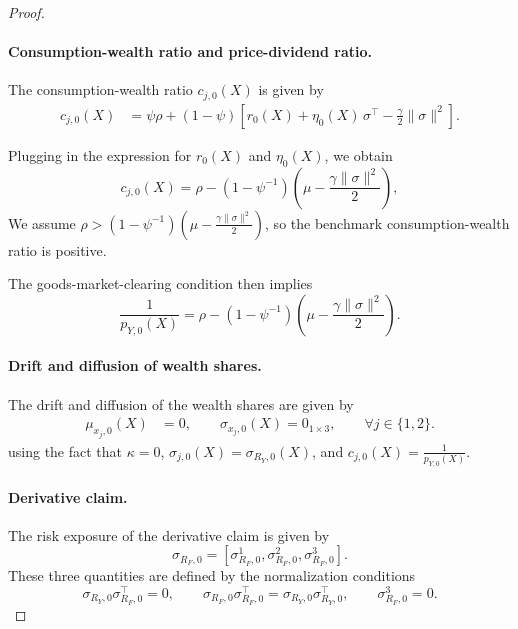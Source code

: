 \begin{proof}
\paragraph{Consumption-wealth ratio and price-dividend ratio.}
The consumption-wealth ratio $c_{j,0}(X)$ is given by
\begin{align}
    c_{j,0}(X) &= \psi \rho 
    + (1-\psi) \left[ r_0(X) + \eta_0(X)\,\sigma^\top - \frac{\gamma}{2} \|\sigma\|^2 \right].
\end{align}

Plugging in the expression for $r_0(X)$ and $\eta_0(X)$, we obtain
\begin{equation}
    c_{j,0}(X) = \rho  - \left(1-\psi^{-1}\right)  \left( \mu - \frac{\gamma\|\sigma\|^2}{2} \right),
\end{equation}
We assume $\rho  > \left(1-\psi^{-1}\right)  \left( \mu - \frac{\gamma\|\sigma\|^2}{2} \right)$, so the benchmark consumption-wealth ratio is positive.

The goods-market-clearing condition then implies
\begin{equation}
    \frac{1}{p_{Y,0}(X)} = \rho  - \left(1-\psi^{-1}\right)  \left( \mu - \frac{\gamma\|\sigma\|^2}{2} \right).
\end{equation}

\paragraph{Drift and diffusion of wealth shares.}
The drift and diffusion of the wealth shares are given by
\begin{align}
    \mu_{x_j,0}(X) &= 0, \qquad
    \sigma_{x_j,0}(X) = 0_{1\times 3}, \qquad
    \forall j \in \{1,2\}.
\end{align}
using the fact that $\kappa = 0$, $\sigma_{j,0}(X) = \sigma_{R_Y,0}(X)$, and $c_{j,0}(X) = \frac{1}{p_{Y,0}(X)}$.

\paragraph{Derivative claim.}
The risk exposure of the derivative claim is given by
\begin{equation}
    \sigma_{R_F,0} = [\sigma_{R_F,0}^1, \sigma_{R_F,0}^2, \sigma_{R_F,0}^3].
\end{equation}
These three quantities are defined by the normalization conditions
\begin{equation}
    \sigma_{R_Y,0} \sigma_{R_F,0}^\top = 0, \qquad 
    \sigma_{R_F,0} \sigma_{R_F,0}^\top = \sigma_{R_Y,0} \sigma_{R_Y,0}^\top,  \qquad 
    \sigma_{R_F,0}^3 = 0.
\end{equation}


\end{proof}
